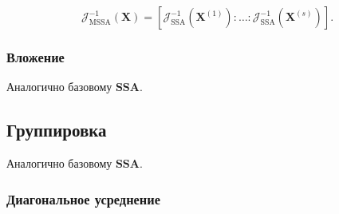 \documentclass[a4paper, 11pt]{article}
\newcommand{\SSA}{\textbf{SSA}}
\begin{document}
\[
	\mathcal{J}^{-1}_{\text{MSSA}}(\mathbf{X}) = [\mathcal{J}^{-1}_{\text{SSA}}(\mathbf{X}^{(1)}) : \ldots : \mathcal{J}^{-1}_{\text{SSA}}(\mathbf{X}^{(s)})].
\]






\subsubsection{Вложение}

Аналогично базовому $\SSA$.

\subsection{Группировка}

Аналогично базовому $\SSA$.

\subsubsection{Диагональное усреднение}
\end{document}
